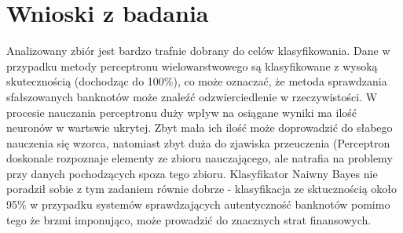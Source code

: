 \documentclass{classrep}
\begin{document}
\section{Wnioski z badania}
Analizowany zbiór jest bardzo trafnie dobrany do celów klasyfikowania. Dane w przypadku metody perceptronu wielowarstwowego są klasyfikowane z wysoką skutecznością (dochodząc do 100\%), co może oznaczać, że metoda sprawdzania sfałszowanych banknotów może znaleźć odzwierciedlenie w rzeczywistości. W procesie nauczania perceptronu duży wpływ na osiągane wyniki ma ilość neuronów w wartswie ukrytej. Zbyt mała ich ilość może doprowadzić do słabego nauczenia się wzorca, natomiast zbyt duża do zjawiska przeuczenia (Perceptron doskonale rozpoznaje elementy ze zbioru nauczającego, ale natrafia na problemy przy danych pochodzących spoza tego zbioru. Klasyfikator Naiwny Bayes nie poradził sobie z tym zadaniem równie dobrze - klasyfikacja ze sktucznością około 95\% w przypadku systemów sprawdzających autentyczność banknotów pomimo tego że brzmi imponująco, może prowadzić do znacznych strat finansowych.
\end{document}
